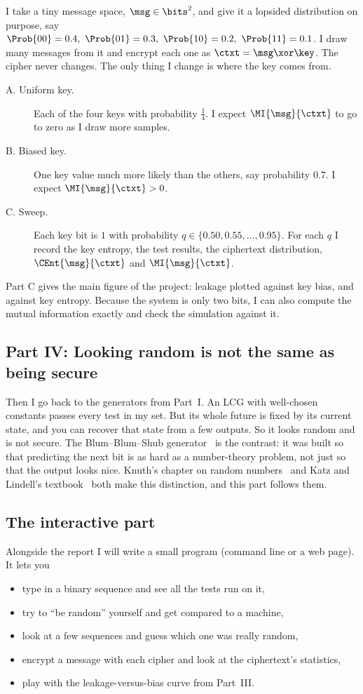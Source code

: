 I take a tiny message space, $\msg \in \bits^2$, and give it a lopsided
distribution on purpose, say
$\Prob{00} = 0.4,\ \Prob{01} = 0.3,\ \Prob{10} = 0.2,\ \Prob{11} = 0.1$.
I draw many messages from it and encrypt each one as $\ctxt = \msg \xor \key$.
The cipher never changes. The only thing I change is where the key comes from.
\begin{description}
  \item[A. Uniform key.] Each of the four keys with probability $\tfrac14$.
        I expect $\MI{\msg}{\ctxt}$ to go to zero as I draw more samples.
  \item[B. Biased key.] One key value much more likely than the others, say
        probability $0.7$. I expect $\MI{\msg}{\ctxt} > 0$.
  \item[C. Sweep.] Each key bit is $1$ with probability
        $q \in \{0.50, 0.55, \dots, 0.95\}$. For each $q$ I record the key
        entropy, the test results, the ciphertext distribution,
        $\CEnt{\msg}{\ctxt}$ and $\MI{\msg}{\ctxt}$.
\end{description}
Part C gives the main figure of the project: leakage plotted against key
bias, and against key entropy. Because the system is only two bits, I can
also compute the mutual information exactly and check the simulation against
it.

\subsection{Part IV: Looking random is not the same as being secure}

Then I go back to the generators from Part~I. An LCG with well-chosen
constants passes every test in my set. But its whole future is fixed by its
current state, and you can recover that state from a few outputs. So it looks
random and is not secure. The Blum--Blum--Shub generator~\cite{blum1986} is
the contrast: it was built so that predicting the next bit is as hard as a
number-theory problem, not just so that the output looks nice. Knuth's
chapter on random numbers~\cite{knuth1997} and Katz and Lindell's
textbook~\cite{katz2020} both make this distinction, and this part follows
them.

\subsection{The interactive part}

Alongside the report I will write a small program (command line or a web
page). It lets you
\begin{itemize}
  \item type in a binary sequence and see all the tests run on it,
  \item try to ``be random'' yourself and get compared to a machine,
  \item look at a few sequences and guess which one was really random,
  \item encrypt a message with each cipher and look at the ciphertext's
        statistics,
  \item play with the leakage-versus-bias curve from Part~III.
\end{itemize}

